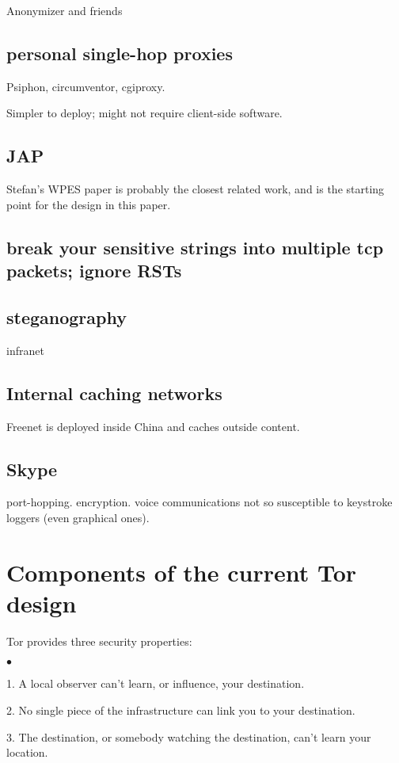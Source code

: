 \documentclass{llncs}
\newenvironment{tightlist}{\begin{list}{$\bullet$}{
  \setlength{\itemsep}{0mm}
    \setlength{\parsep}{0mm}
    }}{\end{list}}
\begin{document}
Anonymizer and friends

\subsection{personal single-hop proxies}

Psiphon, circumventor, cgiproxy.

Simpler to deploy; might not require client-side software.

\subsection{JAP}

Stefan's WPES paper is probably the closest related work, and is
the starting point for the design in this paper.

\subsection{break your sensitive strings into multiple tcp packets;
ignore RSTs}

\subsection{steganography}

infranet

\subsection{Internal caching networks}

Freenet is deployed inside China and caches outside content.

\subsection{Skype}

port-hopping. encryption. voice communications not so susceptible to
keystroke loggers (even graphical ones).

\section{Components of the current Tor design}

Tor provides three security properties:
\begin{tightlist}
\item 1. A local observer can't learn, or influence, your destination.
\item 2. No single piece of the infrastructure can link you to your
destination.
\item 3. The destination, or somebody watching the destination,
can't learn your location.
\end{tightlist}
\end{document}
